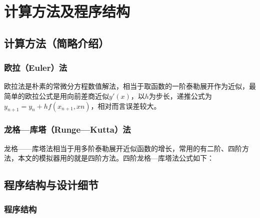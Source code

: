 \documentclass[UTF-8,cs4size]{ctexart}
\begin{document}

\section{计算方法及程序结构}
\subsection{计算方法（简略介绍）}
\subsubsection{欧拉（Euler）法}
欧拉法是朴素的常微分方程数值解法，相当于取函数的一阶泰勒展开作为近似，最简单的欧拉公式是用向前差商近似$y'(x)$，以$h$为步长，递推公式为$y_{n+1} = y_n + hf(x_{n+1},x{n})$，相对而言误差较大。
\subsubsection{龙格—库塔（Runge—Kutta）法}
龙格——库塔法相当于用多阶泰勒展开近似函数的增长，常用的有二阶、四阶方法，本文的模拟器用的就是四阶方法。四阶龙格—库塔法公式如下：
\subsection{程序结构与设计细节}
\subsubsection{程序结构}
\end{document}
